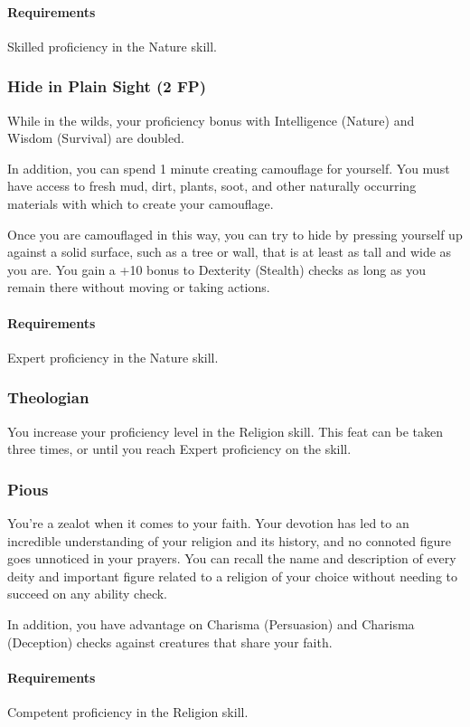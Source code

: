     \paragraph{Requirements} Skilled proficiency in the Nature skill.
\subsubsection{Hide in Plain Sight (2 FP)} \label{feat::hideinplainsight}
    While in the wilds, your proficiency bonus with Intelligence (Nature) and Wisdom (Survival) are doubled.

    In addition, you can spend 1 minute creating camouflage for yourself.
    You must have access to fresh mud, dirt, plants, soot, and other naturally occurring materials with which to create your camouflage.

    Once you are camouflaged in this way, you can try to hide by pressing yourself up against a solid surface, such as a tree or wall, that is at least as tall and wide as you are.
    You gain a +10 bonus to Dexterity (Stealth) checks as long as you remain there without moving or taking actions.
    \paragraph{Requirements} Expert proficiency in the Nature skill.
\subsubsection{Theologian} \label{feat::theologian}
    You increase your proficiency level in the Religion skill.
    This feat can be taken three times, or until you reach Expert proficiency on the skill.
\subsubsection{Pious} \label{feat::pious}
    You're a zealot when it comes to your faith.
    Your devotion has led to an incredible understanding of your religion and its history, and no connoted figure goes unnoticed in your prayers.
    You can recall the name and description of every deity and important figure related to a religion of your choice without needing to succeed on any ability check.

    In addition, you have advantage on Charisma (Persuasion) and Charisma (Deception) checks against creatures that share your faith.
    \paragraph{Requirements} Competent proficiency in the Religion skill.
